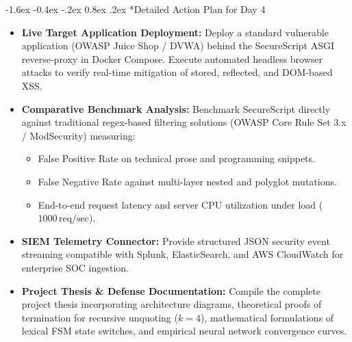 \documentclass[11pt,a4paper]{article}
\makeatletter
\renewcommand{\section}{\@startsection{section}{1}{\z@}%
  {-1.6ex \@plus -0.4ex \@minus -.2ex}%
  {0.8ex \@plus .2ex}%
  {\normalfont\large\bfseries\color{primaryblue}}}
\makeatother
\begin{document}
\section*{Detailed Action Plan for Day 4}
\begin{itemize}[leftmargin=1.5em, itemsep=3pt]
    \item \textbf{Live Target Application Deployment:}
    Deploy a standard vulnerable application (OWASP Juice Shop / DVWA) behind the SecureScript ASGI reverse-proxy in Docker Compose. Execute automated headless browser attacks to verify real-time mitigation of stored, reflected, and DOM-based XSS.

    \item \textbf{Comparative Benchmark Analysis:}
    Benchmark SecureScript directly against traditional regex-based filtering solutions (OWASP Core Rule Set 3.x / ModSecurity) measuring:
    \begin{itemize}[leftmargin=1.2em, itemsep=1pt]
        \item False Positive Rate on technical prose and programming snippets.
        \item False Negative Rate against multi-layer nested and polyglot mutations.
        \item End-to-end request latency and server CPU utilization under load ($1000\,\text{req/sec}$).
    \end{itemize}

    \item \textbf{SIEM Telemetry Connector:}
    Provide structured JSON security event streaming compatible with Splunk, ElasticSearch, and AWS CloudWatch for enterprise SOC ingestion.

    \item \textbf{Project Thesis \& Defense Documentation:}
    Compile the complete project thesis incorporating architecture diagrams, theoretical proofs of termination for recursive unquoting ($k=4$), mathematical formulations of lexical FSM state switches, and empirical neural network convergence curves.
\end{itemize}
\end{document}
